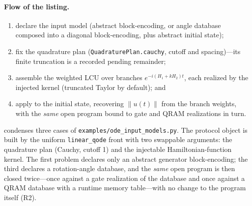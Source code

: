 \paragraph{Flow of the listing.}
\begin{enumerate}
\item declare the input model (abstract block-encoding, or angle database
  composed into a diagonal block-encoding, plus abstract initial state);
\item fix the quadrature plan (\texttt{QuadraturePlan.cauchy}, cutoff and
  spacing)---its finite truncation is a recorded pending remainder;
\item assemble the weighted LCU over branches $e^{-i(H_1+kH_2)t}$, each
  realized by the injected kernel (truncated Taylor by default); and
\item apply to the initial state, recovering $\lVert u(t)\rVert$ from the
  branch weights, with the \emph{same} open program bound to gate and
  QRAM realizations in turn.
\end{enumerate}

 condenses three cases of
\texttt{examples/ode\_input\_models.py}.  The protocol object is built by
the uniform \texttt{linear\_qode} front with two swappable arguments: the
quadrature plan (Cauchy, cutoff 1) and the injectable Hamiltonian-function
kernel.  The first problem declares only an abstract generator block-encoding;
the third declares a rotation-angle database, and the \emph{same} open
program is then closed twice---once against a gate realization of the
database and once against a QRAM database with a runtime memory
table---with no change to the program itself (R2).

